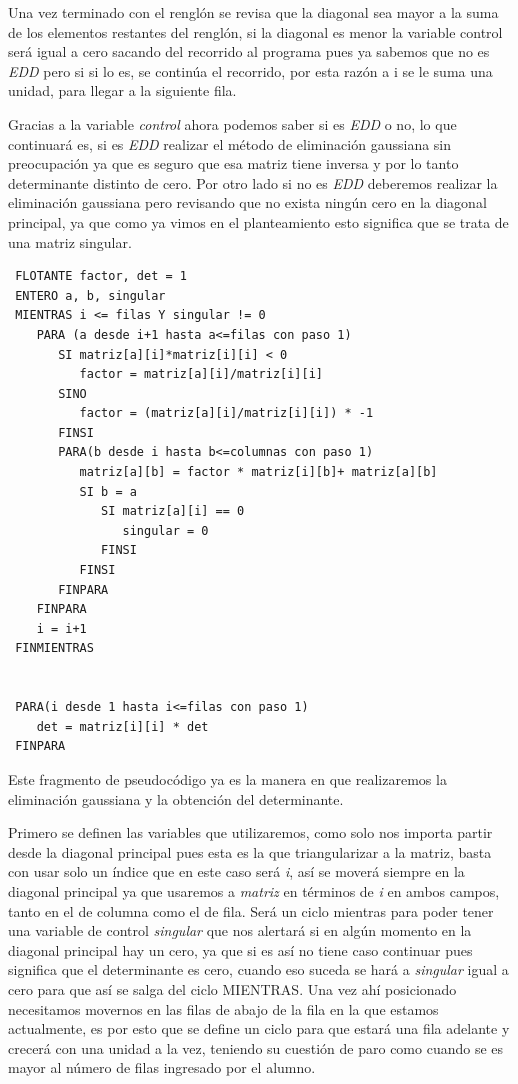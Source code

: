 \documentclass{article}
\begin{document}
Una vez terminado con el renglón se revisa que la diagonal sea mayor a la suma de los
elementos restantes del renglón, si la diagonal es menor la variable control será igual a cero
sacando del recorrido al programa pues ya sabemos que no es \emph{EDD} pero si si lo es, se continúa
el recorrido, por esta razón a i se le suma una unidad, para llegar a la siguiente fila.


Gracias a la variable \emph{control} ahora podemos saber si es \emph{EDD} o no, lo que continuará es,
si es \emph{EDD} realizar el método de eliminación gaussiana sin preocupación ya que es seguro que esa
matriz tiene inversa y por lo tanto determinante distinto de cero.
Por otro lado si no es \emph{EDD} deberemos realizar la eliminación gaussiana pero revisando que no
exista ningún cero en la diagonal principal, ya que como ya vimos en el planteamiento esto significa
que se trata de una matriz singular.


\begin{verbatim}
 FLOTANTE factor, det = 1
 ENTERO a, b, singular
 MIENTRAS i <= filas Y singular != 0
    PARA (a desde i+1 hasta a<=filas con paso 1)
       SI matriz[a][i]*matriz[i][i] < 0
          factor = matriz[a][i]/matriz[i][i]
       SINO
          factor = (matriz[a][i]/matriz[i][i]) * -1
       FINSI
       PARA(b desde i hasta b<=columnas con paso 1)
          matriz[a][b] = factor * matriz[i][b]+ matriz[a][b]
          SI b = a
             SI matriz[a][i] == 0
                singular = 0
             FINSI
          FINSI
       FINPARA
    FINPARA
    i = i+1
 FINMIENTRAS


 PARA(i desde 1 hasta i<=filas con paso 1)
    det = matriz[i][i] * det
 FINPARA
\end{verbatim}
Este fragmento de pseudocódigo ya es la manera en que realizaremos la eliminación
gaussiana y la obtención del determinante.


Primero se definen las variables que utilizaremos, como solo nos importa partir desde
la diagonal principal pues esta es la que triangularizar a la matriz, basta con usar
solo un índice que en este caso será \emph{i}, así se moverá siempre en la diagonal principal
ya que usaremos a \emph{matriz} en términos de \emph{i} en ambos campos, tanto en el de columna como
el de fila. Será un ciclo mientras para poder tener una variable de control \emph{singular}
que nos alertará si en algún momento en la diagonal principal hay un cero, ya que si es así
no tiene caso continuar pues significa que el determinante es cero, cuando eso suceda se hará a
\emph{singular} igual a cero para que así se salga del ciclo MIENTRAS.
Una vez ahí posicionado necesitamos movernos en las filas de abajo de la fila en la que estamos
actualmente, es por esto que se define un ciclo para que estará una fila adelante y crecerá con
una unidad a la vez, teniendo su cuestión de paro como cuando se es mayor al número de filas ingresado
por el alumno.
\end{document}
